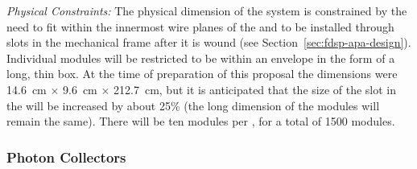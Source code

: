
\emph{Physical Constraints:} The physical dimension of the  system is constrained by the need to fit within the innermost wire planes of the  and to be installed through slots in the  mechanical frame after it is wound (see Section~\ref{sec:fdsp-apa-design}). 
Individual  modules will be restricted to be within an envelope in the form of a long, thin box. At the time of preparation of this proposal the dimensions were \SI{14.6}{cm} $\times$ \SI{9.6}{cm} $\times$ \SI{212.7}{cm}, but it is anticipated that the size of the slot in the  will be increased by about \num{25}\% (the long dimension of the modules will remain the same). There will be ten  modules per , for a total of \num{1500} modules.


\subsubsection{Photon Collectors} 
\label{sssec:photoncollectors}

